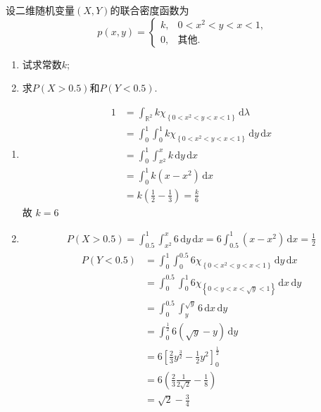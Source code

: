 \documentclass[../main.tex]{subfiles}
\begin{document}
\begin{exercise}{}{}
设二维随机变量$(X,Y)$的联合密度函数为
\[
p(x,y) = \begin{cases}
k, & 0 < x^2 < y < x < 1, \\
0, & \text{其他}.
\end{cases}
\]

\begin{enumerate}
\item 试求常数$k$;
\item 求$P(X>0.5)$和$P(Y<0.5)$.
\end{enumerate}
\end{exercise}
\begin{solution}
  \begin{enumerate}
    \item  \[
   \begin{aligned}
    1&=  \int _{\mathbb{R} ^{2}}k \chi _{\left\{ 0< x^{2}< y< x< 1 \right\}}\,\mathrm{d}  \lambda  \\ 
     &=  \int_{0}^{1} \int_{0}^{1}k  \chi _{\left\{ 0< x^{2}< y< x< 1 \right\}}\,\mathrm{d} y\,\mathrm{d} x\\ 
      &=  \int_{0}^{1} \int_{x^{2}}^{x}k \,\mathrm{d} y\,\mathrm{d} x\\ 
       &=  \int_{0}^{1}k\left( x-x^{2} \right)\,\mathrm{d} x \\ 
        &= k\left( \frac{1 }{2 }-\frac{1 }{3 }   \right)= \frac{k }{6 } 
   \end{aligned}
    \]故 \(  k= 6  \)
  \item      \[
  \begin{aligned}
  P\left( X> 0.5 \right)=  \int_{0.5}^{1} \int_{x^{2}}^{x} 6 \,\mathrm{d} y\,\mathrm{d} x= 6 \int_{0.5}^{1} \left( x-x^{2} \right)\,\mathrm{d} x=\frac{1 }{2 } 
  \end{aligned}
  \]
  \[
  \begin{aligned}
  P\left( Y< 0.5 \right)&=  \int_{0}^{1} \int_{0}^{0.5} 6 \chi _{\left\{ 0< x^{2}< y< x< 1 \right\}}\,\mathrm{d} y\,\mathrm{d} x\\ 
   &=  \int_{0}^{0.5} \int_{0}^{1} 6 \chi _{\left\{ 0< y< x< \sqrt{y}< 1 \right\}}\,\mathrm{d} x\,\mathrm{d} y\\ 
    &=  \int_{0}^{0.5} \int_{y}^{\sqrt{y}}  6\,\mathrm{d} x\,\mathrm{d} y\\ 
     &= \int_{0}^{\frac{1 }{2 } } 6\left( \sqrt{y}-y \right)\,\mathrm{d} y\\ 
      &= 6 \left[ \frac{2 }{3 } y^{\frac{3 }{2 } }- \frac{1 }{2 }y^{2}   \right]_{0}^{\frac{1 }{2 } }\\ 
       &= 6\left( \frac{2 }{3 } \frac{1 }{2\sqrt{2} }- \frac{1 }{8 }    \right)\\ 
        &= \sqrt{2}-\frac{3 }{4 }    
  \end{aligned}
  \]
  \end{enumerate}
  
\end{solution}
\end{document}
